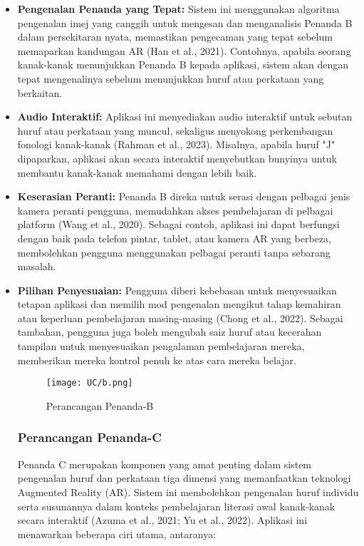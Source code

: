 \begin{itemize}
\item \textbf{Pengenalan Penanda yang Tepat:} Sistem ini menggunakan algoritma pengenalan imej yang canggih untuk mengesan dan menganalisis Penanda B dalam persekitaran nyata, memastikan pengecaman yang tepat sebelum memaparkan kandungan AR (Han et al., 2021). Contohnya, apabila seorang kanak-kanak menunjukkan Penanda B kepada aplikasi, sistem akan dengan tepat mengenalinya sebelum menunjukkan huruf atau perkataan yang berkaitan.  \\
\item \textbf{Audio Interaktif:} Aplikasi ini menyediakan audio interaktif untuk sebutan huruf atau perkataan yang muncul, sekaligus menyokong perkembangan fonologi kanak-kanak (Rahman et al., 2023). Misalnya, apabila huruf "J" dipaparkan, aplikasi akan secara interaktif menyebutkan bunyinya untuk membantu kanak-kanak memahami dengan lebih baik. \\ 
\item \textbf{Keserasian Peranti:} Penanda B direka untuk serasi dengan pelbagai jenis kamera peranti pengguna, memudahkan akses pembelajaran di pelbagai platform (Wang et al., 2020). Sebagai contoh, aplikasi ini dapat berfungsi dengan baik pada telefon pintar, tablet, atau kamera AR yang berbeza, membolehkan pengguna menggunakan pelbagai peranti tanpa sebarang masalah.  \\
\item \textbf{Pilihan Penyesuaian:} Pengguna diberi kebebasan untuk menyesuaikan tetapan aplikasi dan memilih mod pengenalan mengikut tahap kemahiran atau keperluan pembelajaran masing-masing (Chong et al., 2022). Sebagai tambahan, pengguna juga boleh mengubah saiz huruf atau kecerahan tampilan untuk menyesuaikan pengalaman pembelajaran mereka, memberikan mereka kontrol penuh ke atas cara mereka belajar.  \\

\begin{figure}
    \centering
    \texttt{[image: UC/b.png]}
    \caption{Perancangan Penanda-B}
\end{figure}
\clearpage



\subsubsection{Perancangan Penanda-C}
Penanda C merupakan komponen yang amat penting dalam sistem pengenalan huruf dan perkataan tiga dimensi yang memanfaatkan teknologi Augmented Reality (AR). Sistem ini membolehkan pengenalan huruf individu serta susunannya dalam konteks pembelajaran literasi awal kanak-kanak secara interaktif (Azuma et al., 2021; Yu et al., 2022). Aplikasi ini menawarkan beberapa ciri utama, antaranya:\\
 

\end{itemize}
